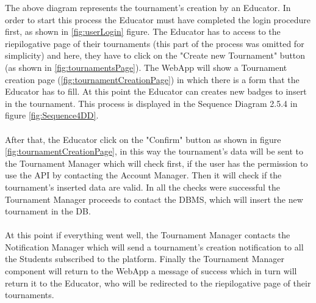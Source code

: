 \documentclass{article}
\begin{document}
{        The above diagram represents the tournament's creation by an Educator.
        In order to start this process the Educator must have completed the login procedure
        first, as shown in \ref{fig:userLogin} figure.
        The Educator has to access to the riepilogative page of their tournaments 
        (this part of the process was omitted for simplicity) and here, they have to click 
        on the "Create new Tournament" button (as shown in \ref{fig:tournamentsPage}).
        The WebApp will show a Tournament creation page (\ref{fig:tournamentCreationPage})
        in which there is a form that the Educator has to fill.
        At this point the Educator can creates new badges to insert in the tournament. This
        process is displayed in the Sequence Diagram 2.5.4 in figure \ref{fig:Sequence4DD}.
        \\ \\
        After that, the Educator click on the "Confirm" button as shown in figure 
        \ref{fig:tournamentCreationPage}, in this way the tournament's data will be sent to the
        Tournament Manager which will check first, if the user has the permission to use the API
        by contacting the Account Manager. Then it will check if the tournament's inserted data
        are valid. In all the checks were successful the Tournament Manager proceeds to
        contact the DBMS, which will insert the new tournament in the DB.
        \\ \\
        At this point if everything went well, the Tournament Manager contacts the Notification
        Manager which will send a tournament's creation notification to all the Students
        subscribed to the platform. 
        Finally the Tournament Manager component will return to the WebApp a message of success
        which in turn will return it to the Educator, who will be redirected to the 
        riepilogative page of their tournaments.

}
\end{document}
